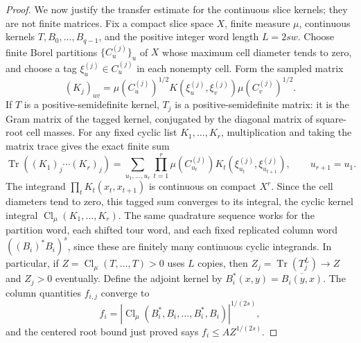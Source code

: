 \begin{proof}
We now justify the transfer estimate for the continuous slice kernels; they are not finite matrices. Fix a compact slice space $X$, finite measure $\mu$, continuous kernels $T,B_0,\ldots,B_{q-1}$, and the positive integer word length $L=2sw$. Choose finite Borel partitions $\{C_u^{(j)}\}_u$ of $X$ whose maximum cell diameter tends to zero, and choose a tag $\xi_u^{(j)}\in C_u^{(j)}$ in each nonempty cell. Form the sampled matrix
\[
 (K_j)_{uv}=\mu(C_u^{(j)})^{1/2}K(\xi_u^{(j)},\xi_v^{(j)})\mu(C_v^{(j)})^{1/2}.
\]
If $T$ is a positive-semidefinite kernel, $T_j$ is a positive-semidefinite matrix: it is the Gram matrix of the tagged kernel, conjugated by the diagonal matrix of square-root cell masses. For any fixed cyclic list $K_1,\ldots,K_r$, multiplication and taking the matrix trace gives the exact finite sum
\[
 \operatorname{Tr}((K_1)_j\cdots(K_r)_j)
 =\sum_{u_1,\ldots,u_r}\prod_{t=1}^{r}\mu(C_{u_t}^{(j)})K_t(\xi_{u_t}^{(j)},\xi_{u_{t+1}}^{(j)}),\qquad u_{r+1}=u_1.
\]
The integrand $\prod_tK_t(x_t,x_{t+1})$ is continuous on compact $X^r$. Since the cell diameters tend to zero, this tagged sum converges to its integral, the cyclic kernel integral $\operatorname{Cl}_\mu(K_1,\ldots,K_r)$. The same quadrature sequence works for the partition word, each shifted tour word, and each fixed replicated column word $((B_i)^*B_i)^s$, since these are finitely many continuous cyclic integrands. In particular, if $Z=\operatorname{Cl}_\mu(T,\ldots,T)>0$ uses $L$ copies, then $Z_j=\operatorname{Tr}(T_j^L)\to Z$ and $Z_j>0$ eventually. Define the adjoint kernel by $B_i^*(x,y)=\overline{B_i(y,x)}$. The column quantities $f_{i,j}$ converge to
\[
 f_i=\left|\operatorname{Cl}_\mu(B_i^*,B_i,\ldots,B_i^*,B_i)\right|^{1/(2s)},
\]
and the centered root bound just proved says $f_i\leq A Z^{1/(2s)}$.


\end{proof}

